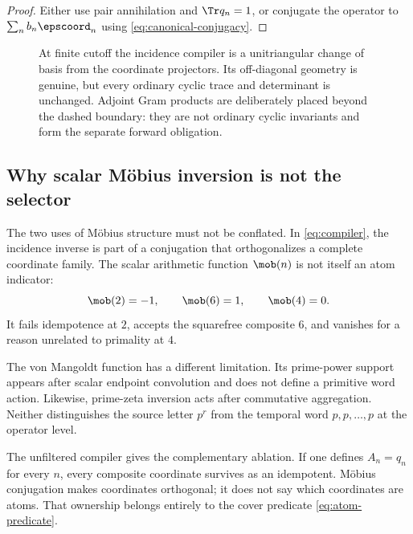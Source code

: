 \begin{proof}
Either use pair annihilation and \(\Tr q_n=1\), or conjugate the operator to
\(\sum_n b_n\epscoord_n\) using \eqref{eq:canonical-conjugacy}.
\end{proof}

\begin{figure}[t]
\centering
\resizebox{0.94\textwidth}{!}{}
\caption{At finite cutoff the incidence compiler is a unitriangular change of
basis from the coordinate projectors. Its off-diagonal geometry is genuine,
but every ordinary cyclic trace and determinant is unchanged. Adjoint Gram
products are deliberately placed beyond the dashed boundary: they are not
ordinary cyclic invariants and form the separate forward obligation.}
\label{fig:similarity-firewall}
\end{figure}

\subsection{Why scalar Möbius inversion is not the selector}

The two uses of Möbius structure must not be conflated. In
\eqref{eq:compiler}, the incidence inverse is part of a conjugation that
orthogonalizes a complete coordinate family. The scalar arithmetic function
\(\mob(n)\) is not itself an atom indicator:
\[
\mob(2)=-1,\qquad \mob(6)=1,\qquad \mob(4)=0.
\]
It fails idempotence at \(2\), accepts the squarefree composite \(6\), and
vanishes for a reason unrelated to primality at \(4\).

The von Mangoldt function has a different limitation. Its prime-power support
appears after scalar endpoint convolution and does not define a primitive
word action. Likewise, prime-zeta inversion acts after commutative
aggregation. Neither distinguishes the source letter \(p^r\) from the
temporal word \(p,p,\ldots,p\) at the operator level.

The unfiltered compiler gives the complementary ablation. If one defines
\(A_n=q_n\) for every \(n\), every composite coordinate survives as an
idempotent. Möbius conjugation makes coordinates orthogonal; it does not say
which coordinates are atoms. That ownership belongs entirely to the cover
predicate \eqref{eq:atom-predicate}.

